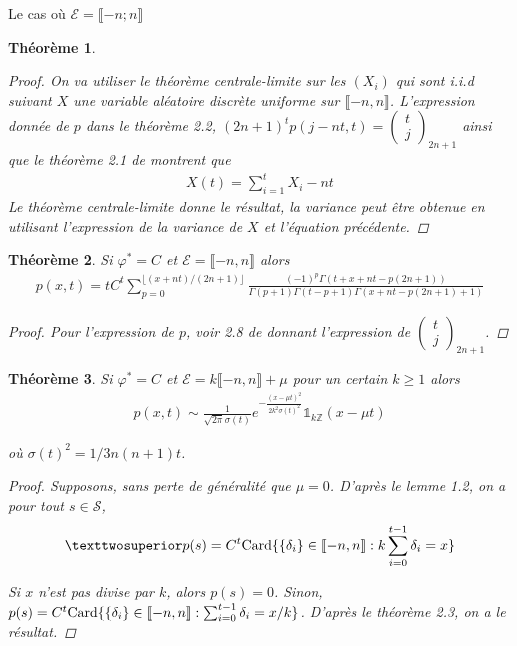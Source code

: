 \documentclass{article}
\newtheorem{theorem}{Théorème}[section]
\begin{document}
\begin{section}{Le cas où $\mathcal{E} = \llbracket -n; n\rrbracket$}
\begin{theorem}
\begin{proof}
	On va utiliser le théorème centrale-limite sur les $(X_i)$ qui sont i.i.d suivant $X$ une variable aléatoire discrète uniforme sur $\llbracket -n,n\rrbracket$. L'expression donnée de $p$ dans le théorème 2.2, $(2n+1)^tp(j-nt,t) = \begin{pmatrix} t\\j\end{pmatrix}_{2n+1}$ ainsi que le théorème 2.1 de \cite{h2} montrent que 
	\begin{align*}
		X(t) = \sum_{i=1}^t X_i - n t
	\end{align*}
	Le théorème centrale-limite donne le résultat, la variance peut être obtenue en utilisant l'expression de la variance de $X$ et l'équation précédente.
\end{proof}
	
\end{theorem}
\begin{theorem}
	Si $\varphi^*=C$ et $\mathcal{E}=\llbracket -n,n\rrbracket$ alors
	\begin{align*}
		p(x,t) = tC^t\sum_{p=0}^{\lfloor (x+nt)/(2n+1)\rfloor} \frac{(-1)^p\Gamma(t+x+nt-p(2n+1))}{\Gamma(p+1)\Gamma(t-p+1)\Gamma(x+nt-p(2n+1)+1)}
	\end{align*}
	\begin{proof}
		Pour l'expression de $p$, voir 2.8 de \cite{h2} donnant l'expression de $\begin{pmatrix} t\\j\end{pmatrix}_{2n+1}$. 
	\end{proof}
\end{theorem}
\begin{theorem}
	Si $\varphi^*=C$ et $\mathcal{E} = k\llbracket -n,n\rrbracket+\mu$ pour un certain $k\geq 1$ alors
	\begin{align*}
		p(x,t) \sim \frac{1}{\sqrt{2\pi}\sigma(t)} e^{-\frac{(x-\mu t)^2}{2k^2\sigma(t)^2}}\mathds{1}_{k\mathbb{Z}}(x-\mu t) 
	\end{align*}

	où $\sigma(t)^2 = 1/3n(n+1)t$.
	\begin{proof}
		Supposons, sans perte de généralité que $\mu = 0$. D'après le lemme 1.2, on a pour tout $s\in \mathcal{S}$, 
		\begin{align*}
		²p(s) = C^t\textup{Card}\{\{\delta_i\} \in \llbracket -n,n\rrbracket : k\sum_{i=0}^{t-1}\delta_i = x\}
		\end{align*}

		Si $x$ n'est pas divise par $k$, alors $p(s) = 0$. Sinon, $p(s) = C^t\textup{Card}\{\{\delta_i\}\in\llbracket -n,n\rrbracket : \sum_{i=0}^{t-1}\delta_i = x/k\}$. D'après le théorème 2.3, on a le résultat.
	\end{proof}
\end{theorem}
\end{section}
\end{document}
